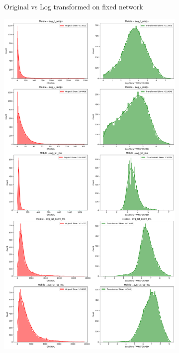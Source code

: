 \documentclass[
  letterpaper,
  DIV=11,
  numbers=noendperiod,
  oneside]{scrartcl}
\begin{document}
\begin{figure}
{\begin{figure}[H]
\caption{Original vs Log transformed on fixed network}

\end{figure}

\begin{figure}[H]

{\centering \includegraphics{data-analytics_files/figure-latex/fig-transcomp-output-4.png}

}
\end{figure}}
\end{figure}
\end{document}
